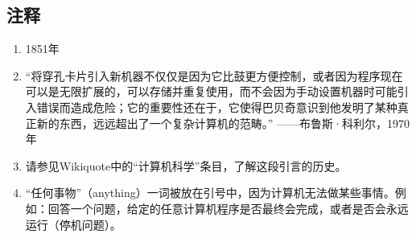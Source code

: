 \subsection{注释}  
\begin{enumerate}
\item 1851年  
\item “将穿孔卡片引入新机器不仅仅是因为它比鼓更方便控制，或者因为程序现在可以是无限扩展的，可以存储并重复使用，而不会因为手动设置机器时可能引入错误而造成危险；它的重要性还在于，它使得巴贝奇意识到他发明了某种真正新的东西，远远超出了一个复杂计算机的范畴。” ——布鲁斯·科利尔，1970年  
\item 请参见Wikiquote中的“计算机科学”条目，了解这段引言的历史。  
\item “任何事物”（anything）一词被放在引号中，因为计算机无法做某些事情。例如：回答一个问题，给定的任意计算机程序是否最终会完成，或者是否会永远运行（停机问题）。
\end{enumerate}
